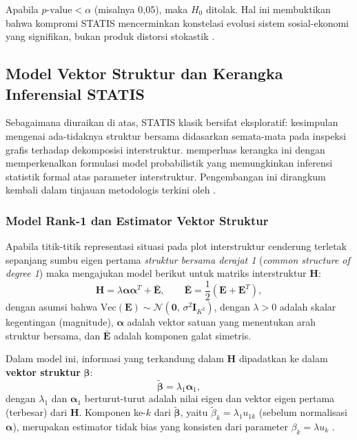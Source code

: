 \begin{enumerate}
    Apabila $p\text{-value} < \alpha$ (misalnya 0{,}05), maka $H_0$ ditolak. Hal ini membuktikan bahwa kompromi STATIS mencerminkan konstelasi evolusi sistem sosial-ekonomi yang signifikan, bukan produk distorsi stokastik \citep{legendre2012}.
\end{enumerate}

\subsection{\normalsize Model Vektor Struktur dan Kerangka Inferensial STATIS}

Sebagaimana diuraikan di atas, STATIS klasik \citep{lavit94} bersifat eksploratif: kesimpulan mengenai ada-tidaknya struktur bersama didasarkan semata-mata pada inspeksi grafis terhadap dekomposisi interstruktur. \citet{areia2008} memperluas kerangka ini dengan memperkenalkan formulasi model probabilistik yang memungkinkan inferensi statistik formal atas parameter interstruktur. Pengembangan ini dirangkum kembali dalam tinjauan metodologis terkini oleh \citet{oliveira2024}.

\subsubsection*{Model Rank-1 dan Estimator Vektor Struktur} \label{subsubsec:vector_struktur}

Apabila titik-titik representasi situasi pada plot interstruktur cenderung terletak sepanjang sumbu eigen pertama \textit{struktur bersama derajat 1} (\textit{common structure of degree 1}) maka \citet{areia2008,mexia2007} mengajukan model berikut untuk matriks interstruktur $\mathbf{H}$:
\begin{equation}\label{eq:model_struktur}
  \mathbf{H} = \lambda \boldsymbol{\alpha} \boldsymbol{\alpha}^T + \bar{\mathbf{E}}, \qquad \bar{\mathbf{E}} = \frac{1}{2}\left(\mathbf{E} + \mathbf{E}^T\right),
\end{equation}
dengan asumsi bahwa $\mathrm{Vec}(\mathbf{E}) \sim \mathcal{N}(\mathbf{0},\, \sigma^2 \mathbf{I}_{K^2})$, dengan $\lambda > 0$ adalah skalar kegentingan (magnitude), $\boldsymbol{\alpha}$ adalah vektor satuan yang menentukan arah struktur bersama, dan $\bar{\mathbf{E}}$ adalah komponen galat simetris.

Dalam model ini, informasi yang terkandung dalam $\mathbf{H}$ dipadatkan ke dalam \textbf{vektor struktur} $\boldsymbol{\beta}$:
\begin{equation}\label{eq:beta_vec}
  \tilde{\boldsymbol{\beta}} = \lambda_1 \boldsymbol{\alpha}_1,
\end{equation}
dengan $\lambda_1$ dan $\boldsymbol{\alpha}_1$ berturut-turut adalah nilai eigen dan vektor eigen pertama (terbesar) dari $\mathbf{H}$. Komponen ke-$k$ dari $\tilde{\boldsymbol{\beta}}$, yaitu $\tilde{\beta}_k = \lambda_1 u_{1k}$ (sebelum normalisasi $\boldsymbol{\alpha}$), merupakan estimator tidak bias yang konsisten dari parameter $\beta_k = \lambda u_k$ \citep{areia2008,oliveira2024}.

